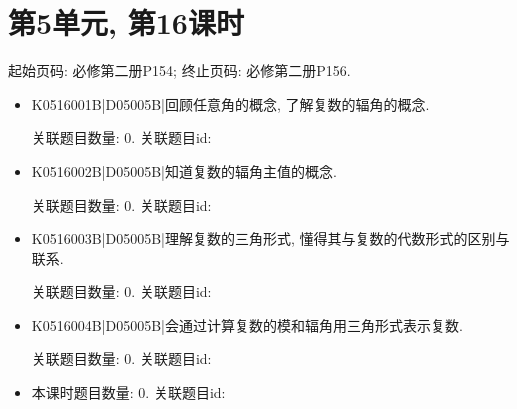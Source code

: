 \section*{第5单元, 第16课时}
起始页码: 必修第二册P154; 终止页码: 必修第二册P156.
\begin{itemize}
\item K0516001B|D05005B|回顾任意角的概念, 了解复数的辐角的概念.

关联题目数量: 0. 关联题目id: 

\item K0516002B|D05005B|知道复数的辐角主值的概念.

关联题目数量: 0. 关联题目id: 

\item K0516003B|D05005B|理解复数的三角形式, 懂得其与复数的代数形式的区别与联系.

关联题目数量: 0. 关联题目id: 

\item K0516004B|D05005B|会通过计算复数的模和辐角用三角形式表示复数.

关联题目数量: 0. 关联题目id: 

\item 本课时题目数量: 0. 关联题目id: 

\end{itemize}

